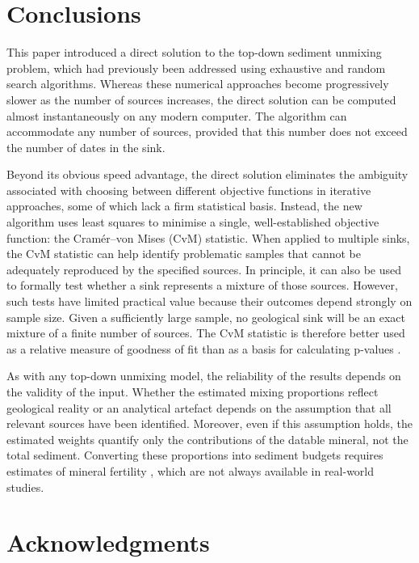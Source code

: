 \documentclass{article}
\begin{document}
\section{Conclusions}\label{sec:conclusions}

This paper introduced a direct solution to the top-down sediment
unmixing problem, which had previously been addressed using exhaustive
and random search algorithms. Whereas these numerical approaches
become progressively slower as the number of sources increases, the
direct solution can be computed almost instantaneously on any modern
computer. The algorithm can accommodate any number of sources,
provided that this number does not exceed the number of dates in the
sink.\medskip

Beyond its obvious speed advantage, the direct solution eliminates the
ambiguity associated with choosing between different objective
functions in iterative approaches, some of which lack a firm
statistical basis. Instead, the new algorithm uses least squares to
minimise a single, well-established objective function: the
Cram\'{e}r--von Mises (CvM) statistic. When applied to multiple sinks,
the CvM statistic can help identify problematic samples that cannot be
adequately reproduced by the specified sources. In principle, it can
also be used to formally test whether a sink represents a mixture of
those sources. However, such tests have limited practical value
because their outcomes depend strongly on sample size. Given a
sufficiently large sample, no geological sink will be an exact mixture
of a finite number of sources. The CvM statistic is therefore better
used as a relative measure of goodness of fit than as a basis for
calculating p-values \citep{vermeesch2018b}.\medskip

As with any top-down unmixing model, the reliability of the results
depends on the validity of the input. Whether the estimated mixing
proportions reflect geological reality or an analytical artefact
depends on the assumption that all relevant sources have been
identified. Moreover, even if this assumption holds, the estimated
weights quantify only the contributions of the datable mineral, not
the total sediment. Converting these proportions into sediment budgets
requires estimates of mineral fertility \citep{malusa2016}, which are
not always available in real-world studies.

\section*{Acknowledgments}
\end{document}

